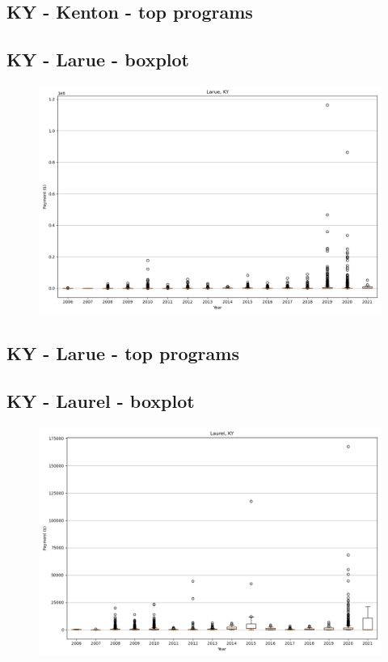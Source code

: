 \subsection*{KY - Kenton - top programs}

\newpage
\subsection*{KY - Larue - boxplot}
\begin{figure}[h]
\centering
\includegraphics[width=7in]{../output/boxplots/counties/Larue-KY_boxplot.png}
\end{figure}


\subsection*{KY - Larue - top programs}

\newpage
\subsection*{KY - Laurel - boxplot}
\begin{figure}[h]
\centering
\includegraphics[width=7in]{../output/boxplots/counties/Laurel-KY_boxplot.png}
\end{figure}



